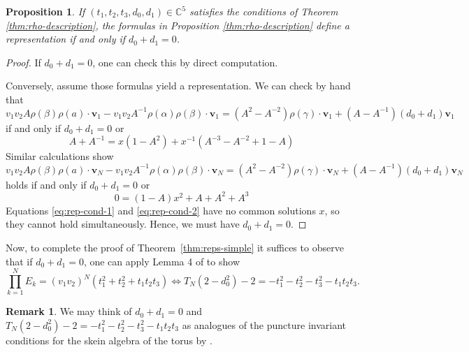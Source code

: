 \documentclass{article}
\newcommand{\C}{\mathbb{C}}
\renewcommand{\v}{\mathbf{v}}
\renewcommand{\a}{\alpha}
\renewcommand{\b}{\beta}
\newcommand{\g}{\gamma}
\newtheorem{proposition}[theorem]{Proposition}
\theoremstyle{definition}
\newtheorem{remark}[theorem]{Remark}
\renewcommand{\g}{\gamma}
\renewcommand{\a}{\alpha}
\renewcommand{\b}{\beta}
\begin{document}
\begin{proposition}
    If $(t_1,t_2,t_3,d_0,d_1)\in \C^5$ satisfies the conditions of Theorem \ref{thm:rho-description}, the formulas in Proposition \ref{thm:rho-description} define a representation if and only if $d_0+d_1=0$.
\end{proposition}
\begin{proof}
	If $d_0+d_1=0$, one can check this by direct computation.
	
Conversely, assume those formulas yield a representation. We can check by hand that 
    \[
    v_1v_2A\rho(\b)\rho(a)\cdot \v_1-  v_1v_2A^{-1}\rho(\a)\rho(\b)\cdot \v_1=(A^2-A^{-2})\rho(\g)\cdot \v_1+(A-A^{-1})(d_0+d_1)\v_1
    \]
    if and only if $d_0+d_1=0$ or
    \begin{equation}\label{eq:rep-cond-1}
        A+A^{-1}=x(1-A^2)+x^{-1}(A^{-3}-A^{-2}+1-A)
    \end{equation}
    Similar calculations show 
    \[
    v_1v_2A\rho(\b)\rho(a)\cdot \v_N-  v_1v_2A^{-1}\rho(\a)\rho(\b)\cdot \v_N=(A^2-A^{-2})\rho(\g)\cdot \v_N+(A-A^{-1})(d_0+d_1)\v_N
    \]
    holds if and only if $d_0+d_1=0$ or 
    \begin{equation}\label{eq:rep-cond-2}
        0=(1-A)x^2+A+A^2+A^3
    \end{equation}
    Equations \ref{eq:rep-cond-1} and \ref{eq:rep-cond-2} have no common solutions $x$, so they cannot hold simultaneously. Hence, we must have $d_0+d_1=0$.
\end{proof}

Now, to complete the proof of Theorem~\ref{thm:reps-simple} it suffices to observe that if $d_0+d_1=0$, one can apply Lemma 4 of \cite{TakenovReps} to show
\begin{equation}\label{eqn:simplifiedE=ts}
 \prod_{k=1}^N E_k=(v_1v_2)^N(t_1^2+t_2^2+t_1t_2t_3) 
    \iff
    T_N(2-d_0^2)-2=-t_1^2-t_2^2-t_3^2-t_1t_2t_3.
\end{equation}






\begin{remark} 
We may think of 
$
d_0+d_1=0$ and $T_N(2-d_0^2)-2=-t_1^2-t_2^2-t_3^2-t_1t_2t_3
$
as analogues of the puncture invariant conditions for the skein algebra of the torus by \cite[Lem.~7]{TakenovReps}. 
\end{remark}
\end{document}
